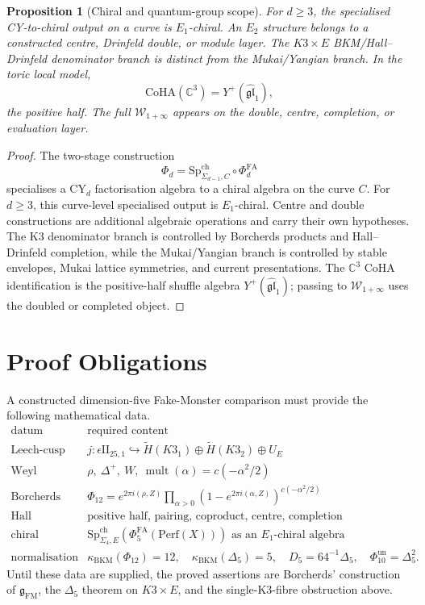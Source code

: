 \documentclass[11pt]{amsart}
\newtheorem{proposition}[theorem]{Proposition}
\theoremstyle{definition}
\theoremstyle{remark}
\providecommand{\C}{\mathbb{C}}
\providecommand{\IIlor}{\mathrm{II}_{25,1}}
\providecommand{\PhiFM}{\Phi_{12}}
\providecommand{\gFM}{\mathfrak{g}_{\mathrm{FM}}}
\providecommand{\PhiFA}{\Phi^{\mathrm{FA}}}
\providecommand{\SpCh}{\mathrm{Sp}^{\mathrm{ch}}}
\providecommand{\Perf}{\mathrm{Perf}}
\providecommand{\CoHA}{\mathrm{CoHA}}
\providecommand{\kBKM}{\kappa_{\mathrm{BKM}}}
\begin{document}
\begin{proposition}[Chiral and quantum-group scope]
\label{prop:chiral-quantum-group-scope}
For \(d\geq3\), the specialised CY-to-chiral output on a curve is
\(E_1\)-chiral. An \(E_2\) structure belongs to a constructed centre,
Drinfeld double, or module layer. The \(K3\times E\) BKM/Hall--Drinfeld
denominator branch is distinct from the Mukai/Yangian branch. In the
toric local model,
\[
 \CoHA(\C^3)=Y^+(\widehat{\mathfrak{gl}}_1),
\]
the positive half. The full \(\mathcal W_{1+\infty}\) appears on the
double, centre, completion, or evaluation layer.
\end{proposition}

\begin{proof}
The two-stage construction
\[
 \Phi_d=\SpCh_{\Sigma_{d-1},C}\circ\PhiFA_d
\]
specialises a CY\(_d\) factorisation algebra to a chiral algebra on the
curve \(C\). For \(d\geq3\), this curve-level specialised output is
\(E_1\)-chiral. Centre and double constructions are additional algebraic
operations and carry their own hypotheses. The K3 denominator branch is
controlled by Borcherds products and Hall--Drinfeld completion, while
the Mukai/Yangian branch is controlled by stable envelopes, Mukai
lattice symmetries, and current presentations. The \(\C^3\) CoHA
identification is the positive-half shuffle algebra
\(Y^+(\widehat{\mathfrak{gl}}_1)\); passing to
\(\mathcal W_{1+\infty}\) uses the doubled or completed object.
\end{proof}

\section{Proof Obligations}

A constructed dimension-five Fake-Monster comparison must provide the
following mathematical data.
\[
\begin{array}{l|l}
\text{datum} & \text{required content}\\
\hline
\text{Leech-cusp embedding} &
j:\epsilon\IIlor\hookrightarrow
\widetilde H(K3_1)\oplus\widetilde H(K3_2)\oplus U_E\\
\text{Weyl chamber} &
\rho,\ \Delta^+,\ W,\ \operatorname{mult}(\alpha)=c(-\alpha^2/2)\\
\text{Borcherds product} &
\PhiFM=e^{2\pi i(\rho,Z)}
\prod_{\alpha>0}(1-e^{2\pi i(\alpha,Z)})^{c(-\alpha^2/2)}\\
\text{Hall comparison} &
\text{positive half, pairing, coproduct, centre, completion}\\
\text{chiral specialisation} &
\SpCh_{\Sigma_4,E}(\PhiFA_5(\Perf(X)))\text{ as an }E_1\text{-chiral algebra}\\
\text{normalisation} &
\kBKM(\PhiFM)=12,\quad
\kBKM(\Delta_5)=5,\quad
D_5=64^{-1}\Delta_5,\quad
\Phi_{10}^{\mathrm{un}}=\Delta_5^2 .
\end{array}
\]
Until these data are supplied, the proved assertions are Borcherds'
construction of \(\gFM\), the \(\Delta_5\) theorem on \(K3\times E\), and
the single-K3-fibre obstruction above.
\end{document}
